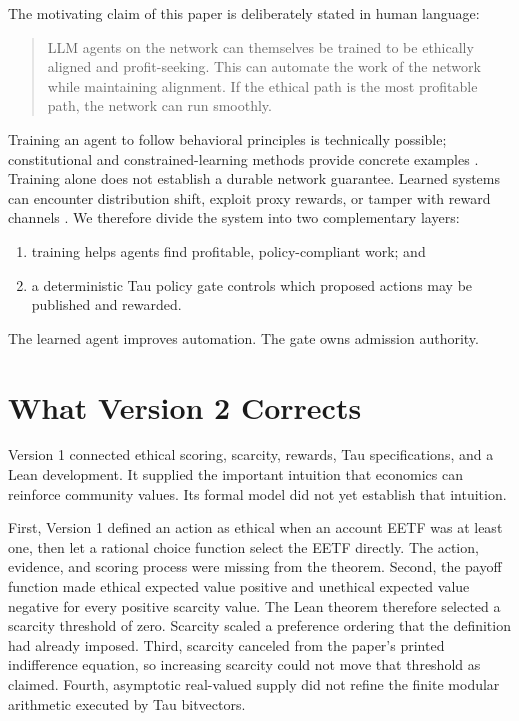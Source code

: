 \documentclass[11pt]{article}
\begin{document}
The motivating claim of this paper is deliberately stated in human language:

\begin{quote}
LLM agents on the network can themselves be trained to be ethically aligned and
profit-seeking.  This can automate the work of the network while maintaining
alignment.  If the ethical path is the most profitable path, the network can run
smoothly.
\end{quote}

Training an agent to follow behavioral principles is technically possible;
constitutional and constrained-learning methods provide concrete examples
\cite{bai2022constitutional,achiam2017constrained}.  Training alone does not
establish a durable network guarantee.  Learned systems can encounter
distribution shift, exploit proxy rewards, or tamper with reward channels
\cite{amodei2016concrete,denison2024rewardtampering}.  We therefore divide the
system into two complementary layers:

\begin{enumerate}
  \item training helps agents find profitable, policy-compliant work; and
  \item a deterministic Tau policy gate controls which proposed actions may be
  published and rewarded.
\end{enumerate}

The learned agent improves automation.  The gate owns admission authority.

\section{What Version 2 Corrects}

Version 1 connected ethical scoring, scarcity, rewards, Tau specifications, and
a Lean development.  It supplied the important intuition that economics can
reinforce community values.  Its formal model did not yet establish that
intuition.

First, Version 1 defined an action as ethical when an account EETF was at least
one, then let a rational choice function select the EETF directly.  The action,
evidence, and scoring process were missing from the theorem.  Second, the payoff
function made ethical expected value positive and unethical expected value
negative for every positive scarcity value.  The Lean theorem therefore selected
a scarcity threshold of zero.  Scarcity scaled a preference ordering that the
definition had already imposed.  Third, scarcity canceled from the paper's
printed indifference equation, so increasing scarcity could not move that
threshold as claimed.  Fourth, asymptotic real-valued supply did not refine the
finite modular arithmetic executed by Tau bitvectors.
\end{document}
